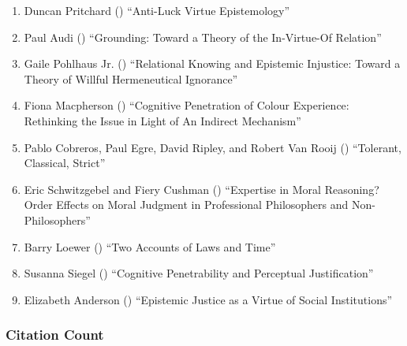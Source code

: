 \documentclass[
  10pt,
  letterpaper,
  DIV=11,
  numbers=noendperiod,
  twoside]{scrartcl}
\providecommand{\tightlist}{%
  \setlength{\itemsep}{0pt}\setlength{\parskip}{0pt}}\usepackage{longtable,booktabs,array}
\begin{document}
\begin{enumerate}
\def\labelenumi{\arabic{enumi}.}
\tightlist
\item
  Duncan Pritchard () ``Anti-Luck
  Virtue Epistemology''
\item
  Paul Audi () ``Grounding:
  Toward a Theory of the In-Virtue-Of Relation''
\item
  Gaile Pohlhaus Jr. ()
  ``Relational Knowing and Epistemic Injustice: Toward a Theory of
  Willful Hermeneutical Ignorance''
\item
  Fiona Macpherson () ``Cognitive
  Penetration of Colour Experience: Rethinking the Issue in Light of An
  Indirect Mechanism''
\item
  Pablo Cobreros, Paul Egre, David Ripley, and Robert Van Rooij
  () ``Tolerant, Classical,
  Strict''
\item
  Eric Schwitzgebel and Fiery Cushman
  () ``Expertise in Moral
  Reasoning? Order Effects on Moral Judgment in Professional
  Philosophers and Non-Philosophers''
\item
  Barry Loewer () ``Two Accounts
  of Laws and Time''
\item
  Susanna Siegel () ``Cognitive
  Penetrability and Perceptual Justification''
\item
  Elizabeth Anderson ()
  ``Epistemic Justice as a Virtue of Social Institutions''
\end{enumerate}

\subsubsection*{Citation Count}\label{sec-count-2012}
\end{document}
